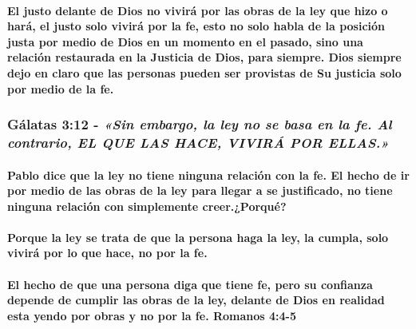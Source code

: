 \documentclass[11a pt,twoside]{article}
\newcommand{\scripture}[1]{%
  {\fontsize{12pt}{16pt}\selectfont\ScriptureFont\itshape #1}%
}
\let\oldsubsubsection\subsubsection
\renewcommand{\subsubsection}{\needspace{4\baselineskip}\oldsubsubsection}
\let\oldparagraph\paragraph
\renewcommand{\paragraph}{\needspace{3\baselineskip}\oldparagraph}
\begin{document}
\paragraph{El justo delante de Dios no vivirá por las obras de la ley
que hizo o hará, el justo solo vivirá por la fe, esto no solo habla de
la posición justa por medio de Dios en un momento en el pasado, sino una
relación restaurada en la Justicia de Dios, para siempre. Dios siempre
dejo en claro que las personas pueden ser provistas de Su justicia solo
por medio de la
fe.}\label{el-justo-delante-de-dios-no-viviruxe1-por-las-obras-de-la-ley-que-hizo-o-haruxe1-el-justo-solo-viviruxe1-por-la-fe-esto-no-solo-habla-de-la-posiciuxf3n-justa-por-medio-de-dios-en-un-momento-en-el-pasado-sino-una-relaciuxf3n-restaurada-en-la-justicia-de-dios-para-siempre.-dios-siempre-dejo-en-claro-que-las-personas-pueden-ser-provistas-de-su-justicia-solo-por-medio-de-la-fe.}

\subsubsection{\texorpdfstring{Gálatas 3:12 -
\scripture{«Sin embargo, la ley no se basa en la fe. Al contrario, EL QUE LAS HACE, VIVIRÁ POR ELLAS.»}}{Gálatas 3:12 - }}\label{guxe1latas-312---sin-embargo-la-ley-no-se-basa-en-la-fe.-al-contrario-el-que-las-hace-viviruxe1-por-ellas.}

\paragraph{Pablo dice que la ley no tiene ninguna relación con la fe. El
hecho de ir por medio de las obras de la ley para llegar a se
justificado, no tiene ninguna relación con simplemente
creer.¿Porqué?}\label{pablo-dice-que-la-ley-no-tiene-ninguna-relaciuxf3n-con-la-fe.-el-hecho-de-ir-por-medio-de-las-obras-de-la-ley-para-llegar-a-se-justificado-no-tiene-ninguna-relaciuxf3n-con-simplemente-creer.porquuxe9}

\paragraph{Porque la ley se trata de que la persona haga la ley, la
cumpla, solo vivirá por lo que hace, no por la
fe.}\label{porque-la-ley-se-trata-de-que-la-persona-haga-la-ley-la-cumpla-solo-viviruxe1-por-lo-que-hace-no-por-la-fe.}

\paragraph{El hecho de que una persona diga que tiene fe, pero su
confianza depende de cumplir las obras de la ley, delante de Dios en
realidad esta yendo por obras y no por la fe. Romanos
4:4-5}\label{el-hecho-de-que-una-persona-diga-que-tiene-fe-pero-su-confianza-depende-de-cumplir-las-obras-de-la-ley-delante-de-dios-en-realidad-esta-yendo-por-obras-y-no-por-la-fe.-romanos-44-5}
\end{document}
